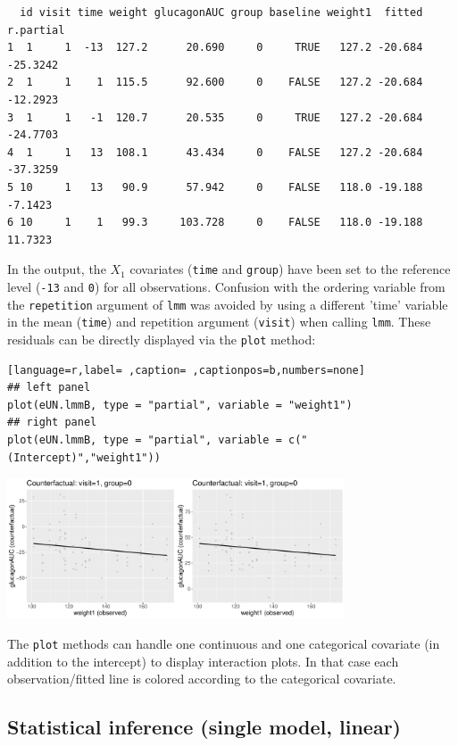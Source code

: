\documentclass[12pt]{article}
\begin{document}
\begin{verbatim}
  id visit time weight glucagonAUC group baseline weight1  fitted r.partial
1  1     1  -13  127.2      20.690     0     TRUE   127.2 -20.684  -25.3242
2  1     1    1  115.5      92.600     0    FALSE   127.2 -20.684  -12.2923
3  1     1   -1  120.7      20.535     0     TRUE   127.2 -20.684  -24.7703
4  1     1   13  108.1      43.434     0    FALSE   127.2 -20.684  -37.3259
5 10     1   13   90.9      57.942     0    FALSE   118.0 -19.188   -7.1423
6 10     1    1   99.3     103.728     0    FALSE   118.0 -19.188   11.7323
\end{verbatim}


In the output, the \(X_1\) covariates (\texttt{time} and \texttt{group}) have been
set to the reference level (\texttt{-13} and \texttt{0}) for all
observations. Confusion with the ordering variable from the
\texttt{repetition} argument of \texttt{lmm} was avoided by using a different 'time'
variable in the mean (\texttt{time}) and repetition argument (\texttt{visit}) when
calling \texttt{lmm}.  These residuals can be directly displayed via the
\texttt{plot} method:
\begin{lstlisting}[language=r,label= ,caption= ,captionpos=b,numbers=none]
## left panel
plot(eUN.lmmB, type = "partial", variable = "weight1")
## right panel
plot(eUN.lmmB, type = "partial", variable = c("(Intercept)","weight1"))
\end{lstlisting}

\begin{center}
\includegraphics[width=0.75\textwidth]{./figures/fit-pres.pdf}
\end{center}

The \texttt{plot} methods can handle one continuous and one categorical
covariate (in addition to the intercept) to display interaction
plots. In that case each observation/fitted line is colored according
to the categorical covariate.

\clearpage

\subsection{Statistical inference (single model, linear)}
\label{sec:org2edf6c6}
\end{document}
